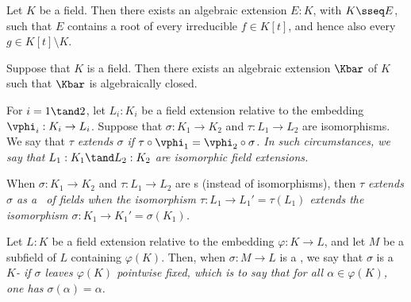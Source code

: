 \documentclass[a4paper]{article}
\begin{document}
\begin{tlemma}
  Let \( K \) be a field.
  Then there exists an algebraic extension \( E:K \), with \( K\sseq E \), such that \( E \) contains a root of every irreducible \( f\in K[t] \), and hence also every \( g\in K[t]\setminus K \).
\end{tlemma}

\begin{ttheorem}
  Suppose that \( K \) is a field.
  Then there exists an algebraic extension \( \Kbar \) of \( K \) such that \( \Kbar \) is algebraically closed.
\end{ttheorem}

\begin{tdefinition}
  For \( i = 1 \tand 2 \), let \( L_i : K_i \) be a field extension relative to the embedding \( \vphi_i : K_i\to L_i \).
  Suppose that \( \sigma : K_1\to K_2 \) and \( \tau:L_1\to L_2 \) are isomorphisms.
  We say that \it{\( \tau \) extends \( \sigma \)} if \( \tau\circ\vphi_1 = \vphi_2\circ\sigma \).
  In such circumstances, we say that \( L_1 : K_1 \tand L_2 : K_2 \) are \it{isomorphic field extensions}.
  \begin{center}
  \end{center}
  When \( \sigma:K_1\to K_2 \) and \( \tau:L_1\to L_2 \) are \homo s (instead of isomorphisms), then \it{\( \tau \) extends \( \sigma \) as a \homo~of fields} when the isomorphism \( \tau:L_1\to L_1' = \tau(L_1) \) extends the isomorphism \( \sigma:K_1\to K_1' = \sigma(K_1) \).
\end{tdefinition}

\begin{tdefinition}[\(K\)-\homo]
  Let \( L : K \) be a field extension relative to the embedding \( \varphi : K \to L \), and let \( M \) be a subfield of \( L \) containing \( \varphi(K) \).
  Then, when \( \sigma : M \to L \) is a \homo, we say that \( \sigma \) is a \it{\(K\)-\homo} if \( \sigma \) leaves \( \varphi(K) \) pointwise fixed, which is to say that for all \( \alpha \in \varphi(K) \), one has \( \sigma(\alpha) = \alpha \).
\end{tdefinition}
\end{document}
